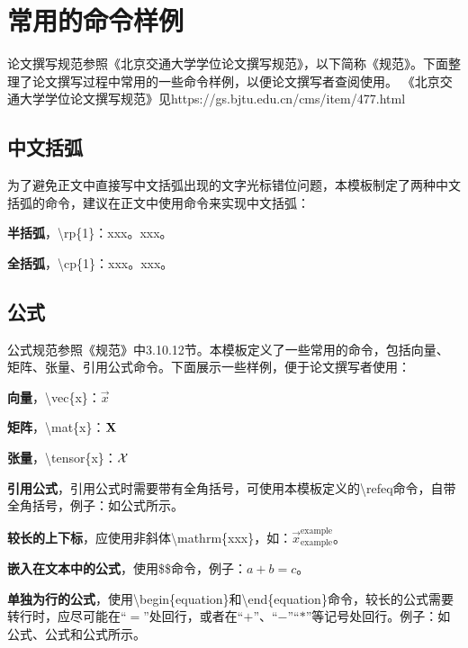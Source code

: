  \setlength{\baselineskip}{20pt}
\chapter{常用的命令样例}
\label{cha:chap2}

论文撰写规范参照《北京交通大学学位论文撰写规范》，以下简称《规范》。下面整理了论文撰写过程中常用的一些命令样例，以便论文撰写者查阅使用。
《北京交通大学学位论文撰写规范》见https://gs.bjtu.edu.cn/cms/item/477.html

\section{中文括弧}
为了避免正文中直接写中文括弧出现的文字光标错位问题，本模板制定了两种中文括弧的命令，建议在正文中使用命令来实现中文括弧：

\textbf{半括弧}，\textbackslash rp\{1\}：xxx。xxx。

\textbf{全括弧}，\textbackslash cp\{1\}：xxx。xxx。

\section{公式}

公式规范参照《规范》中3.10.12节。本模板定义了一些常用的命令，包括向量、矩阵、张量、引用公式命令。下面展示一些样例，便于论文撰写者使用：

\textbf{向量}，\textbackslash vec\{x\}：$\vec{x}$

\textbf{矩阵}，\textbackslash mat\{x\}：${\bf X}$

\textbf{张量}，\textbackslash tensor\{x\}：${\mathcal X}$

\textbf{引用公式}，引用公式时需要带有全角括号，可使用本模板定义的\textbackslash refeq命令，自带全角括号，例子：如公式所示。

\textbf{较长的上下标}，应使用非斜体\textbackslash mathrm\{xxx\}，如：$\vec{x}_{\mathrm{example}}^{\mathrm{example}}$。



\textbf{嵌入在文本中的公式}，使用\$\$命令，例子：$a + b = c$。

\textbf{单独为行的公式}，使用\textbackslash begin\{equation\}和\textbackslash end\{equation\}命令，较长的公式需要转行时，应尽可能在“$ = $”处回行，或者在“$ + $”、“$-$”“$*$”等记号处回行。例子：如公式、公式和公式所示。

